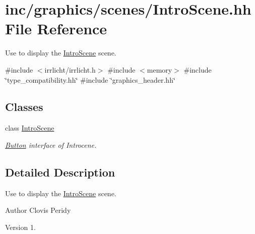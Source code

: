 \hypertarget{IntroScene_8hh}{}\section{inc/graphics/scenes/\+Intro\+Scene.hh File Reference}
\label{IntroScene_8hh}


Use to display the \hyperlink{classIntroScene}{Intro\+Scene} scene.  


{\ttfamily \#include $<$irrlicht/irrlicht.\+h$>$}\newline
{\ttfamily \#include $<$memory$>$}\newline
{\ttfamily \#include \char`\"{}type\+\_\+compatibility.\+hh\char`\"{}}\newline
{\ttfamily \#include \char`\"{}graphics\+\_\+header.\+hh\char`\"{}}\newline
\subsection*{Classes}
\begin{DoxyCompactItemize}
\item 
class \hyperlink{classIntroScene}{Intro\+Scene}
\begin{DoxyCompactList}\small\item\em \hyperlink{classButton}{Button} interface of Introcene. \end{DoxyCompactList}\end{DoxyCompactItemize}


\subsection{Detailed Description}
Use to display the \hyperlink{classIntroScene}{Intro\+Scene} scene. 

\begin{DoxyAuthor}{Author}
Clovis Peridy 
\end{DoxyAuthor}
\begin{DoxyVersion}{Version}
1. 
\end{DoxyVersion}
